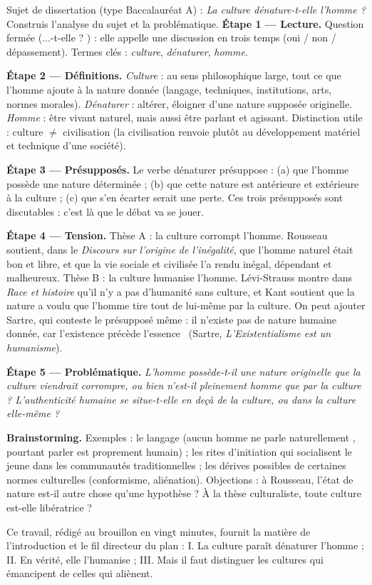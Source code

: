 \documentclass[11pt]{article}
\begin{document}
\begin{exoresolu}
Sujet de dissertation (type Baccalauréat A) : \emph{La culture dénature-t-elle l'homme ?} Construis l'analyse du sujet et la problématique.
\tcblower
\textbf{Étape 1 — Lecture.} Question fermée (\guillemotleft ...-t-elle ? \guillemotright) : elle appelle une discussion en trois temps (oui / non / dépassement). Termes clés : \emph{culture}, \emph{dénaturer}, \emph{homme}.

\textbf{Étape 2 — Définitions.} \emph{Culture} : au sens philosophique large, tout ce que l'homme ajoute à la nature donnée (langage, techniques, institutions, arts, normes morales). \emph{Dénaturer} : altérer, éloigner d'une nature supposée originelle. \emph{Homme} : être vivant naturel, mais aussi être parlant et agissant. Distinction utile : culture $\neq$ civilisation (la civilisation renvoie plutôt au développement matériel et technique d'une société).

\textbf{Étape 3 — Présupposés.} Le verbe \guillemotleft dénaturer \guillemotright présuppose : (a) que l'homme possède une nature déterminée ; (b) que cette nature est antérieure et extérieure à la culture ; (c) que s'en écarter serait une perte. Ces trois présupposés sont discutables : c'est là que le débat va se jouer.

\textbf{Étape 4 — Tension.} Thèse A : la culture corrompt l'homme. Rousseau soutient, dans le \emph{Discours sur l'origine de l'inégalité}, que l'homme naturel était bon et libre, et que la vie sociale et civilisée l'a rendu inégal, dépendant et malheureux. Thèse B : la culture humanise l'homme. Lévi-Strauss montre dans \emph{Race et histoire} qu'il n'y a pas d'humanité sans culture, et Kant soutient que la nature a voulu que l'homme tire tout de lui-même par la culture. On peut ajouter Sartre, qui conteste le présupposé même : il n'existe pas de nature humaine donnée, car \guillemotleft l'existence précède l'essence \guillemotright\ (Sartre, \emph{L'Existentialisme est un humanisme}).

\textbf{Étape 5 — Problématique.} \emph{L'homme possède-t-il une nature originelle que la culture viendrait corrompre, ou bien n'est-il pleinement homme que par la culture ? L'authenticité humaine se situe-t-elle en deçà de la culture, ou dans la culture elle-même ?}

\textbf{Brainstorming.} Exemples : le langage (aucun homme ne parle \guillemotleft naturellement \guillemotright, pourtant parler est proprement humain) ; les rites d'initiation qui socialisent le jeune dans les communautés traditionnelles ; les dérives possibles de certaines normes culturelles (conformisme, aliénation). Objections : à Rousseau, l'état de nature est-il autre chose qu'une hypothèse ? À la thèse culturaliste, toute culture est-elle libératrice ?

Ce travail, rédigé au brouillon en vingt minutes, fournit la matière de l'introduction et le fil directeur du plan : I. La culture paraît dénaturer l'homme ; II. En vérité, elle l'humanise ; III. Mais il faut distinguer les cultures qui émancipent de celles qui aliènent.
\end{exoresolu}
\end{document}
